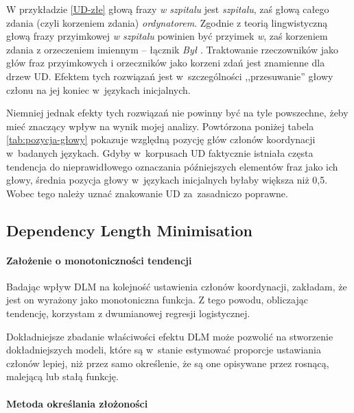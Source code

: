 W przykładzie \eqref{UD-złe} głową frazy \textit{w szpitalu} jest \textit{szpitalu}, zaś głową całego zdania (czyli korzeniem zdania) \textit{ordynatorem}. Zgodnie z teorią lingwistyczną głową frazy przyimkowej \textit{w szpitalu} powinien być przyimek \textit{w}, zaś korzeniem zdania z orzeczeniem imiennym -- łącznik \textit{Był} \citep{hoeksema1992head}. Traktowanie rzeczowników jako głów fraz przyimkowych i orzeczników jako korzeni zdań jest znamienne dla drzew UD. Efektem tych rozwiązań jest w~szczególności ,,przesuwanie'' głowy członu na jej koniec w~językach inicjalnych.

Niemniej jednak efekty tych rozwiązań nie powinny być na tyle powszechne, żeby mieć znaczący wpływ na wynik mojej analizy. Powtórzona poniżej tabela \ref{tab:pozycja-głowy} pokazuje względną pozycję głów członów koordynacji w~badanych językach. Gdyby w~korpusach UD faktycznie istniała częsta tendencja do nieprawidłowego oznaczania późniejszych elementów fraz jako ich głowy, średnia pozycja głowy w~językach inicjalnych byłaby większa niż 0,5. Wobec tego należy uznać znakowanie UD za~zasadniczo poprawne.



\subsection{Dependency Length Minimisation}

\paragraph{Założenie o monotoniczności tendencji}

Badając wpływ DLM na kolejność ustawienia członów koordynacji, zakładam, że jest on wyrażony jako monotoniczna funkcja. Z tego powodu, obliczając tendencję, korzystam z dwumianowej regresji logistycznej.


Dokładniejsze zbadanie właściwości efektu DLM może pozwolić na stworzenie dokładniejszych modeli, które są w~stanie estymować proporcje ustawiania członów lepiej, niż przez samo określenie, że są one opisywane przez rosnącą, malejącą lub stałą funkcję. 

\paragraph{Metoda określania złożoności}

